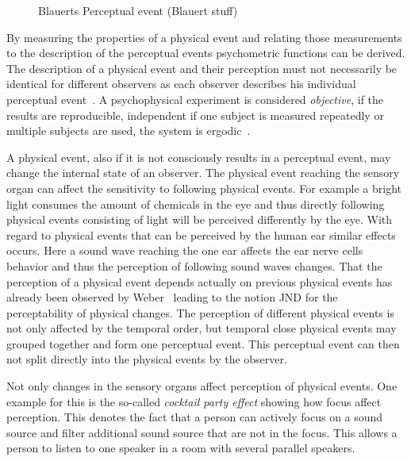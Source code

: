 \begin{figure}
	\caption{Blauerts Perceptual event (Blauert stuff)}	
	\label{img:chap02:auditory-event}
\end{figure}

By measuring the properties of a physical event and relating those measurements to the description of the perceptual events psychometric functions can be derived.
The description of a physical event and their perception must not necessarily be identical for different observers as each observer describes his individual perceptual event~\cite[p. 11]{blauert_spatial_1996}.
A psychophysical experiment is considered \emph{objective}, if the results are reproducible, independent if one subject is measured repeatedly or multiple subjects are used, \ie the system is ergodic~\cite[p. 11]{blauert_spatial_1996}.

A physical event, also if it is not consciously results in a perceptual event, may change the internal state of an observer.
The physical event reaching the sensory organ can affect the sensitivity to following physical events.
For example a bright light consumes the amount of chemicals in the eye and thus directly following physical events consisting of light will be perceived differently by the eye.
With regard to physical events that can be perceived by the human ear similar effects occurs.
Here a sound wave reaching the one ear affects the ear nerve cells behavior and thus the perception of following sound waves changes. %
That the perception of a physical event depends actually on previous physical events has already been observed by Weber~\cite{Weber-Fechner} leading to the notion \ac{JND} for the perceptability of physical changes.
The perception of different physical events is not only affected by the temporal order, but temporal close physical events may grouped together and form one perceptual event.%
This perceptual event can then not split directly into the physical events by the observer.

Not only changes in the sensory organs affect perception of physical events.
One example for this is the so-called \emph{cocktail party effect} showing how focus affect perception.
This denotes the fact that a person can actively focus on a sound source and filter additional sound source that are not in the focus.
This allows a person to listen to one speaker in a room with several parallel speakers.

